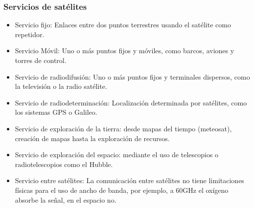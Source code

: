 	\subsubsection{Servicios de satélites}
	\label{ssub:serviciosSat}
		\begin{itemize}
			\item Servicio fijo: Enlaces entre dos puntos terrestres usando el satélite como repetidor.
			\item Servicio Móvil: Uno o más puntos fijos y móviles, como barcos, aviones y torres de control.
			\item Servicio de radiodifusión: Uno o más puntos fijos y terminales dispersos, como la televisión o la radio satélite.
			\item Servicio de radiodeterminación: Localización determinada por satélites, como los sistemas GPS o Galileo.
			\item Servicio de exploración de la tierra: desde mapas del tiempo (meteosat), creación de mapas hasta la exploración de recursos.
			\item Servicio de exploración del espacio: mediante el uso de telescopios o radiotelescopios como el Hubble.
			\item Servicio entre satélites: La comunicación entre satélites no tiene limitaciones físicas para el uso de ancho de banda, por ejemplo, a 60GHz el oxígeno absorbe la señal, en el espacio no.
		\end{itemize}

